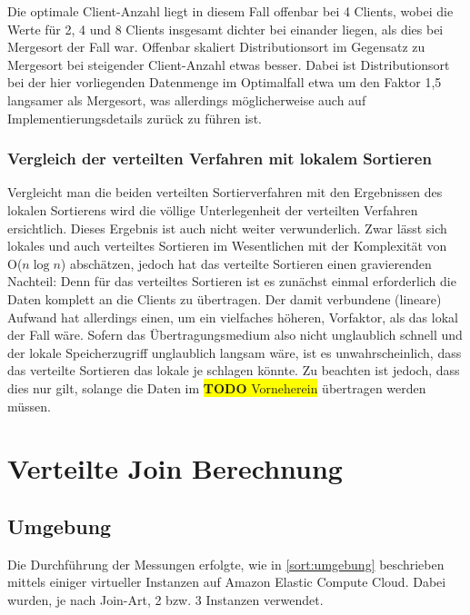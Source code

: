 \documentclass[fontsize=12pt,a4paper,headinclude=no,headings=small]{scrartcl}
\newcommand{\todo}[1]{\colorbox{yellow}{\textbf{TODO} #1}}
\begin{document}
Die optimale Client-Anzahl liegt in diesem Fall offenbar bei 4 Clients, wobei die Werte für 2, 4 und 8 Clients insgesamt dichter bei einander liegen, als dies bei Mergesort der Fall war. Offenbar skaliert Distributionsort im Gegensatz zu Mergesort bei steigender Client-Anzahl etwas besser. Dabei ist Distributionsort bei der hier vorliegenden Datenmenge im Optimalfall etwa um den Faktor 1,5 langsamer als Mergesort, was allerdings möglicherweise auch auf Implementierungsdetails zurück zu führen ist.

\subsubsection{Vergleich der verteilten Verfahren mit lokalem Sortieren}
Vergleicht man die beiden verteilten Sortierverfahren mit den Ergebnissen des lokalen Sortierens wird die völlige Unterlegenheit der verteilten Verfahren ersichtlich. Dieses Ergebnis ist auch nicht weiter verwunderlich. Zwar lässt sich lokales und auch verteiltes Sortieren im Wesentlichen mit der Komplexität von O($n \log n$) abschätzen, jedoch hat das verteilte Sortieren einen gravierenden Nachteil: Denn für das verteiltes Sortieren ist es zunächst einmal erforderlich die Daten komplett an die Clients zu übertragen. Der damit verbundene (lineare) Aufwand hat allerdings einen, um ein vielfaches höheren, Vorfaktor, als das lokal der Fall wäre. Sofern das Übertragungsmedium also nicht unglaublich schnell und der lokale Speicherzugriff unglaublich langsam wäre, ist es unwahrscheinlich, dass das verteilte Sortieren das lokale je schlagen könnte. Zu beachten ist jedoch, dass dies nur gilt, solange die Daten im \todo{Vorneherein} übertragen werden müssen.

\section{Verteilte Join Berechnung}
\subsection{Umgebung}
Die Durchführung der Messungen erfolgte, wie in \ref{sort:umgebung} beschrieben mittels einiger virtueller Instanzen auf Amazon Elastic Compute Cloud. Dabei wurden, je nach Join-Art, 2 bzw. 3 Instanzen verwendet.
\end{document}
